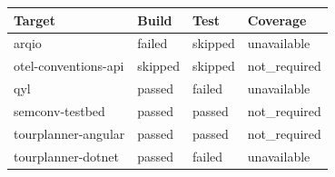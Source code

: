 \begin{tabular}{llll}
\hline
Target & Build & Test & Coverage \\
\hline
arqio & failed & skipped & unavailable \\
otel-conventions-api & skipped & skipped & not\_required \\
qyl & passed & failed & unavailable \\
semconv-testbed & passed & passed & not\_required \\
tourplanner-angular & passed & passed & not\_required \\
tourplanner-dotnet & passed & failed & unavailable \\
\hline
\end{tabular}
